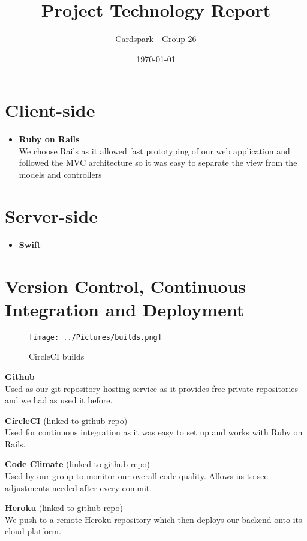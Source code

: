 \documentclass[a4wide, 11pt]{article}
\begin{document}
\title{Project Technology Report}

\author{Cardspark - Group 26}

\date{\today}         %

\maketitle            %

\section{Client-side}
\begin{itemize}
\item \textbf{Ruby on Rails}\\
We choose Rails as it allowed fast prototyping of our web application and followed the MVC architecture so it was easy to separate the view from the models and controllers
\end{itemize}

\section{Server-side}
\begin{itemize}
\item \textbf{Swift}\\ 
\end{itemize}

\section{Version Control, Continuous Integration and Deployment}
\begin{itemize}
    \parbox[t]{\dimexpr\textwidth-\leftmargin}{%
      \vspace{-2.5mm}
      \begin{wrapfigure}[16]{r}{0.5\textwidth}
        \centering
        \vspace{-\baselineskip}
		\texttt{[image: ../Pictures/builds.png]}
        \caption{CircleCI builds}
      \end{wrapfigure}
\item \textbf{Github}\\
Used as our git repository hosting service as it provides free private repositories and we had as used it before.
\item \textbf{CircleCI} (linked to github repo)\\
Used for continuous integration as it was easy to set up and works with Ruby on Rails.
\item \textbf{Code Climate} (linked to github repo)\\
Used by our group to monitor our overall code quality.  Allows us to see adjustments needed after every commit.
\item \textbf{Heroku} (linked to github repo)\\
We push to a remote Heroku repository which then deploys our backend onto its 
cloud platform.
    }
  \end{itemize}
\end{document}
